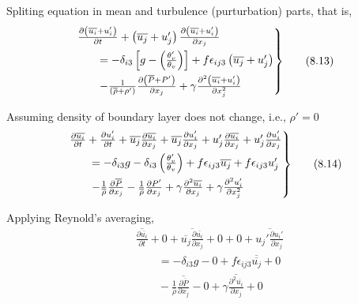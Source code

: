 \documentclass[fleqn,10pt]{SelfArx} %
\begin{document}
Spliting equation in mean and turbulence (purturbation) parts, that is,
\begin{align*}
	\begin{rcases}
		 & \frac{\partial\left(\overline{u_i} + u_i'\right)}{\partial t} + \left(\overline{u_j} + u_j' \right)\frac{\partial \left(\overline{u_i} + u_i'\right)}{\partial x_j} \\ &\quad\quad = -\delta_{i3}\left[g - \left(\frac{\theta_v'}{\theta_v}\right)\right] + f \epsilon_{ij3}\left(\overline{u_j} + u_j'\right) \\ &\quad\quad - \frac{1}{\left(\overline{\rho} + \rho'\right)}\frac{\partial \left(\overline{P} + P'\right)}{\partial x_j} + \gamma\frac{\partial^2 \left(\overline{u_i} + u_i'\right)}{\partial x_j^2}
	\end{rcases} & \tag{8.13} \label{eq:8.13}
\end{align*}

Assuming density of boundary layer does not change, i.e., $\rho' = 0$
\begin{align*}
	\begin{rcases}
		 & \frac{\partial \overline{u_i}}{\partial t} + \frac{\partial u_i'}{\partial t} + \overline{u_j}\frac{\partial \overline{u_i}}{\partial x_j} +\overline{u_j}\frac{\partial u_i'}{\partial x_j} + u_j'\frac{\partial \overline{u_i}}{\partial x_j} + u_j'\frac{\partial u_i'}{\partial x_j} \\ &\quad\quad = -\delta_{i3}g - \delta_{i3}\left(\frac{\theta_v'}{\theta_v}\right) + f \epsilon_{ij3}\overline{u_j} + f \epsilon_{ij3} u_j' \\ &\quad\quad - \frac{1}{\overline{\rho}}\frac{\partial\overline{P}}{\partial x_j} - \frac{1}{\overline{\rho}}\frac{\partial P'}{\partial x_j} + \gamma\frac{\partial^2 \overline{u_i}}{\partial x_j} + \gamma\frac{\partial^2 u_i'}{\partial x_j^2}
	\end{rcases} & \tag{8.14} \label{eq:8.14}
\end{align*}

Applying Reynold's averaging,
\begin{align*}
	& \overline{\frac{\partial \overline{u_i}}{\partial t}} + 0 + \overline{\overline{u_j}\frac{\partial \overline{u_i}}{\partial x_j}} + 0 + 0 + \overline{u_j'\frac{\partial u_i'}{\partial x_j}} \\ &\quad\quad = -\delta_{i3}g - 0 + f \epsilon_{ij3}\overline{\overline{u_j}} + 0 \\ &\quad\quad - \frac{1}{\overline{\rho}}\overline{\frac{\partial\overline{P}}{\partial x_j}} - 0 + \gamma\overline{\frac{\partial^2 \overline{u_i}}{\partial x_j}} + 0
\end{align*}
\end{document}

